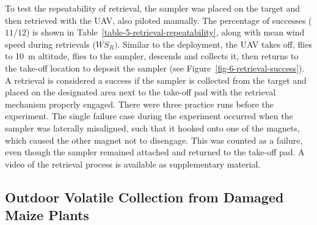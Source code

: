 To test the repeatability of retrieval, the sampler was placed on the target and then retrieved with the UAV, also piloted manually. The percentage of successes  ($11/12$) is shown in Table~\ref{table-5-retrieval-repeatability}, along with mean wind speed during retrievals ($\overline{WS}_R)$. Similar to the deployment, the UAV takes off, flies to 10~m altitude, flies to the sampler, descends and collects it, then returns to the take-off location to deposit the sampler (see Figure~\ref{fig-6-retrieval-success}). A retrieval is considered a success if the sampler is collected from the target and placed on the designated area next to the take-off pad with the retrieval mechanism properly engaged. There were three practice runs before the experiment. The single failure case during the experiment occurred when the sampler was laterally misaligned, such that it hooked onto one of the magnets, which caused the other magnet not to disengage. This was counted as a failure, even though the sampler remained attached and returned to the take-off pad. A video of the retrieval process is available as supplementary material.




\subsection{Outdoor Volatile Collection from Damaged Maize Plants}
\label{outdoor_volatile_collection}

